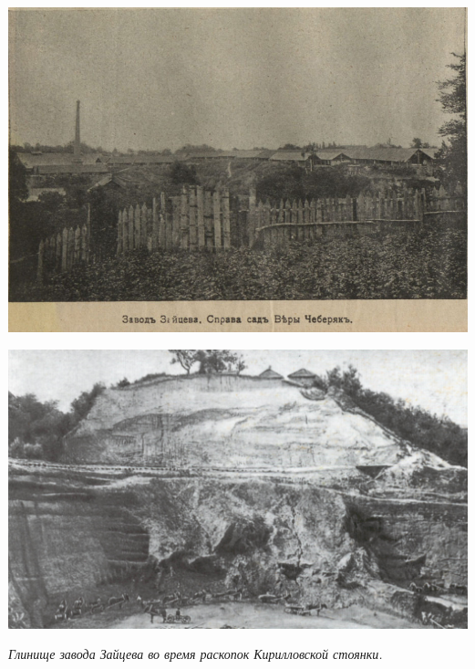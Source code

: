 \begin{center}
\includegraphics[width=\linewidth]{pix/1912-beylis-03.jpg}
\end{center} 

\newpage
\vspace*{\fill}
\begin{center}
\includegraphics[width=\linewidth]{pix/hvoyka-02.jpg}

\textit{Глинище завода Зайцева во время раскопок Кирилловской стоянки.}
\end{center} 

